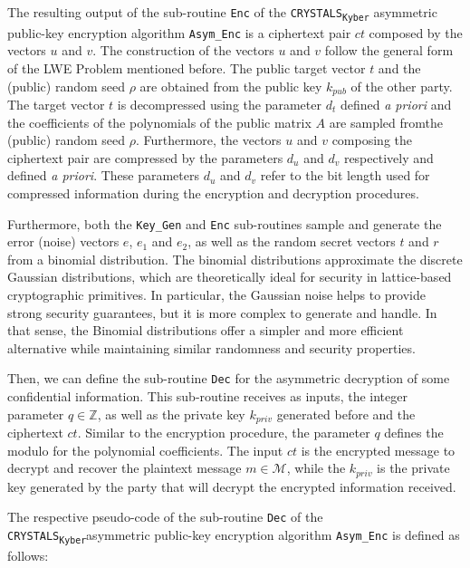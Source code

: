 \documentclass[runningheads]{llncs}
\numberwithin{equation}{section}
\begin{document}
    \noindent The resulting output of the sub-routine \texttt{Enc} of the \texorpdfstring{\texttt{CRYSTALS}\textsubscript{\texttt{Kyber}}}\/ asymmetric public-key encryption algorithm \texttt{Asym\_Enc} is a ciphertext pair $ct$ composed by the vectors $u$ and $v$. The construction of the vectors $u$ and $v$ follow the general form of the LWE Problem mentioned before. The public target vector $t$ and the (public) random seed $\rho$ are obtained from the public key ${k}_{pub}$ of the other party. The target vector $t$ is decompressed using the parameter ${d}_{t}$ defined \textit{a priori} and the coefficients of the polynomials of the public matrix $A$ are sampled from\break the (public) random seed $\rho$. Furthermore, the vectors $u$ and $v$ composing the ciphertext pair are compressed by the parameters ${d}_{u}$ and ${d}_{v}$ respectively and defined \textit{a priori}. These parameters ${d}_{u}$ and ${d}_{v}$ refer to the bit length used for compressed information during the encryption and decryption procedures.

    Furthermore, both the \texttt{Key\_Gen} and \texttt{Enc} sub-routines sample and generate the error (noise) vectors $e$, ${e}_{1}$ and ${e}_{2}$, as well as the random secret vectors $t$ and $r$ from a binomial distribution. The binomial distributions approximate the discrete Gaussian distributions, which are theoretically ideal for security in lattice-based cryptographic primitives. In particular, the Gaussian noise helps to provide strong security guarantees, but it is more complex to generate and handle. In that sense, the Binomial distributions offer a simpler and more efficient alternative while maintaining similar randomness and security properties.

    Then, we can define the sub-routine \texttt{Dec} for the asymmetric decryption of some confidential information. This sub-routine receives as inputs, the integer parameter $q \in \mathbb{Z}$, as well as the private key ${k}_{priv}$ generated before and the ciphertext $ct$. Similar to the encryption procedure, the parameter $q$ defines the modulo for the polynomial coefficients. The input $ct$ is the encrypted message to decrypt and recover the plaintext message $m \in \mathcal{M}$, while the ${k}_{priv}$ is the private key generated by the party that will decrypt the encrypted information received.

    \vspace{2ex}
    
    \noindent The respective pseudo-code of the sub-routine \texttt{Dec} of the \texorpdfstring{\texttt{CRYSTALS}\textsubscript{\texttt{Kyber}}}\/\break asymmetric public-key encryption algorithm \texttt{Asym\_Enc} is defined as follows:
    \vspace{-3.75ex}
\end{document}
